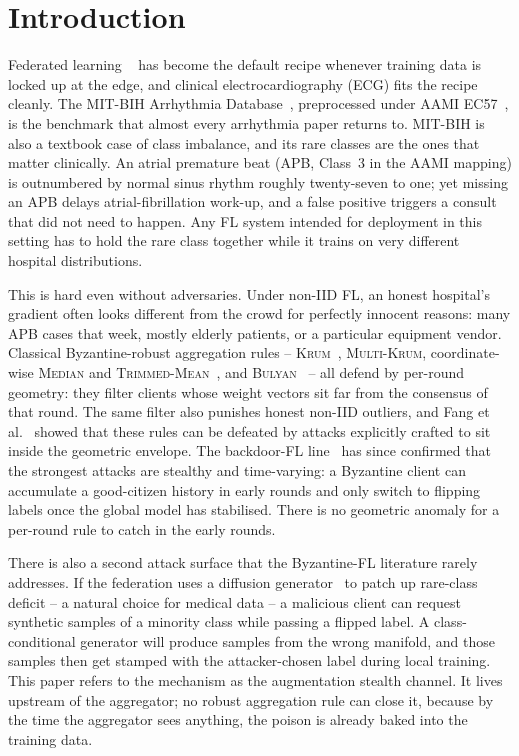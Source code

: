\documentclass[runningheads]{llncs}
\newcommand{\krum}{\textsc{Krum}\xspace}
\newcommand{\mkrum}{\textsc{Multi-Krum}\xspace}
\newcommand{\median}{\textsc{Median}\xspace}
\newcommand{\tmean}{\textsc{Trimmed-Mean}\xspace}
\newcommand{\bulyan}{\textsc{Bulyan}\xspace}
\begin{document}
\section{Introduction}
\label{sec:intro}

Federated learning ~\cite{mcmahan2017fedavg,kairouz2021advances}
has become the default recipe whenever training data is locked up at
the edge, and clinical electrocardiography (ECG) fits the recipe
cleanly. The MIT-BIH Arrhythmia Database~\cite{moody2001mitbih},
preprocessed under AAMI EC57~\cite{aami1998ec57}, is the benchmark
that almost every arrhythmia paper returns to. MIT-BIH is also a
textbook case of class imbalance, and its rare classes are the ones
that matter clinically. An atrial premature beat (APB, Class~3 in
the AAMI mapping) is outnumbered by normal sinus rhythm roughly
twenty-seven to one; yet missing an APB delays atrial-fibrillation
work-up, and a false positive triggers a consult that did not need
to happen. Any FL system intended for deployment in this setting has
to hold the rare class together while it trains on very different
hospital distributions.

This is hard even without adversaries. Under non-IID FL, an honest
hospital's gradient often looks different from the crowd for
perfectly innocent reasons: many APB cases that week, mostly elderly
patients, or a particular equipment vendor. Classical Byzantine-robust
aggregation rules -- \krum~\cite{blanchard2017krum}, \mkrum,
coordinate-wise \median and \tmean~\cite{yin2018byzantine}, and
\bulyan~\cite{elmhamdi2018bulyan} -- all defend by per-round geometry:
they filter clients whose weight vectors sit far from the consensus
of that round. The same filter also punishes honest non-IID outliers,
and Fang et al.~\cite{fang2020local} showed that these rules can be
defeated by attacks explicitly crafted to sit inside the geometric
envelope. The backdoor-FL line~\cite{bagdasaryan2020how,foroughi2026lsa} has since confirmed that the
strongest attacks are stealthy and time-varying: a Byzantine client
can accumulate a good-citizen history in early rounds and only switch
to flipping labels once the global model has stabilised. There is no
geometric anomaly for a per-round rule to catch in the early rounds.

There is also a second attack surface that the Byzantine-FL
literature rarely addresses. If the federation uses a diffusion
generator~\cite{ho2020ddpm,rombach2022ldm} to patch up rare-class
deficit -- a natural choice for medical data -- a malicious client
can request synthetic samples of a minority class while passing a
flipped label. A class-conditional generator will produce samples
from the wrong manifold, and those samples then get stamped with the
attacker-chosen label during local training. This paper refers to the
mechanism as the augmentation stealth channel. It lives upstream of the aggregator;
no robust aggregation rule can close it, because by the time the
aggregator sees anything, the poison is already baked into the
training data.
\end{document}
